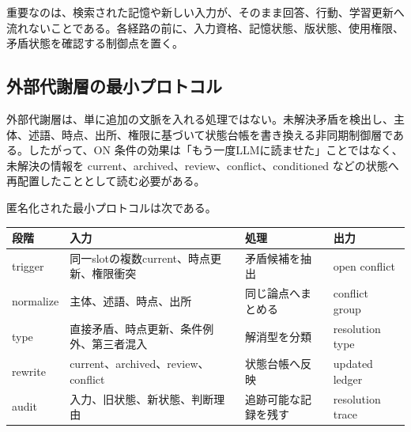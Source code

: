 \documentclass[12pt,a4paper]{article}
\begin{document}
重要なのは、検索された記憶や新しい入力が、そのまま回答、行動、学習更新へ流れないことである。各経路の前に、入力資格、記憶状態、版状態、使用権限、矛盾状態を確認する制御点を置く。

\subsection{外部代謝層の最小プロトコル}\label{ux5916ux90e8ux4ee3ux8b1dux5c64ux306eux6700ux5c0fux30d7ux30edux30c8ux30b3ux30eb}

外部代謝層は、単に追加の文脈を入れる処理ではない。未解決矛盾を検出し、主体、述語、時点、出所、権限に基づいて状態台帳を書き換える非同期制御層である。したがって、ON 条件の効果は「もう一度LLMに読ませた」ことではなく、未解決の情報を current、archived、review、conflict、conditioned などの状態へ再配置したこととして読む必要がある。

匿名化された最小プロトコルは次である。

{\def\LTcaptype{table} %
\begin{longtable}[]{@{}
  >{\raggedright\arraybackslash}p{}
  >{\raggedright\arraybackslash}p{}
  >{\raggedright\arraybackslash}p{}
  >{\raggedright\arraybackslash}p{}@{}}
\toprule\noalign{}
\begin{minipage}[b]{\linewidth}\raggedright
段階
\end{minipage} & \begin{minipage}[b]{\linewidth}\raggedright
入力
\end{minipage} & \begin{minipage}[b]{\linewidth}\raggedright
処理
\end{minipage} & \begin{minipage}[b]{\linewidth}\raggedright
出力
\end{minipage} \\
\midrule\noalign{}
\endhead
\bottomrule\noalign{}
\endlastfoot
trigger & 同一slotの複数current、時点更新、権限衝突 & 矛盾候補を抽出 & open conflict \\
normalize & 主体、述語、時点、出所 & 同じ論点へまとめる & conflict group \\
type & 直接矛盾、時点更新、条件例外、第三者混入 & 解消型を分類 & resolution type \\
rewrite & current、archived、review、conflict & 状態台帳へ反映 & updated ledger \\
audit & 入力、旧状態、新状態、判断理由 & 追跡可能な記録を残す & resolution trace \\
\end{longtable}
}
\end{document}

